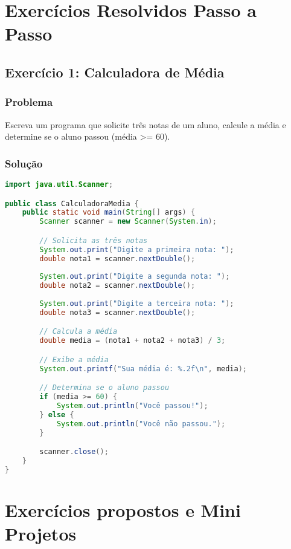 \documentclass[a4paper,12pt]{book}
\begin{document}
\section{Exercícios Resolvidos Passo a Passo}

\subsection{Exercício 1: Calculadora de Média}
\subsubsection{Problema}
Escreva um programa que solicite três notas de um aluno, calcule a média e determine se o aluno passou (média >= 60).

\subsubsection{Solução}
\begin{lstlisting}[language=Java, caption=Calculadora de Média, inputencoding=utf8]
import java.util.Scanner;

public class CalculadoraMedia {
    public static void main(String[] args) {
        Scanner scanner = new Scanner(System.in);

        // Solicita as três notas
        System.out.print("Digite a primeira nota: ");
        double nota1 = scanner.nextDouble();
        
        System.out.print("Digite a segunda nota: ");
        double nota2 = scanner.nextDouble();
        
        System.out.print("Digite a terceira nota: ");
        double nota3 = scanner.nextDouble();

        // Calcula a média
        double media = (nota1 + nota2 + nota3) / 3;

        // Exibe a média
        System.out.printf("Sua média é: %.2f\n", media);

        // Determina se o aluno passou
        if (media >= 60) {
            System.out.println("Você passou!");
        } else {
            System.out.println("Você não passou.");
        }

        scanner.close();
    }
}
\end{lstlisting}

\section{Exercícios propostos e Mini Projetos}
\end{document}
